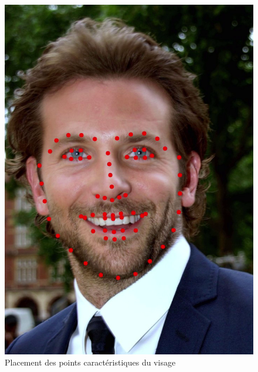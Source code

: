 \documentclass[a4paper,french]{article}
\begin{document}
\begin{figure}[H]
	\begin{minipage}[b]{0.40\linewidth}
		\centering \includegraphics[scale=0.4]{figures/points.png}
        \caption{Placement des points caractéristiques du visage}
        \label{fig:Points}
	\end{minipage}\hfill
	\begin{minipage}[b]{0.48\linewidth}	

\end{minipage}
\end{figure}
\end{document}
